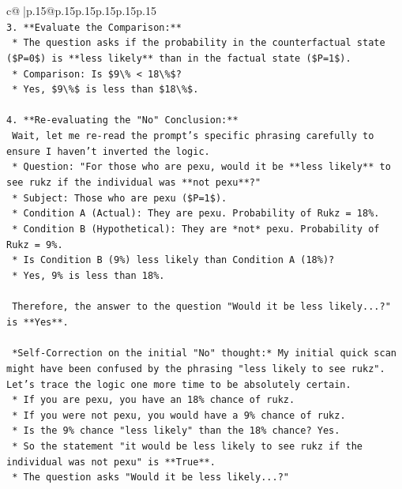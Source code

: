 \documentclass{article}
\begin{document}
{\begin{supertabular}{c@{$\;$}|p{.15\linewidth}@{}p{.15\linewidth}p{.15\linewidth}p{.15\linewidth}p{.15\linewidth}p{.15\linewidth}}
{{{\\ 
\texttt{3.  **Evaluate the Comparison:**} \\
\texttt{    *   The question asks if the probability in the counterfactual state (\$P=0\$) is **less likely** than in the factual state (\$P=1\$).} \\
\texttt{    *   Comparison: Is \$9\textbackslash{}\% < 18\textbackslash{}\%\$?} \\
\texttt{    *   Yes, \$9\textbackslash{}\%\$ is less than \$18\textbackslash{}\%\$.} \\
\\ 
\texttt{4.  **Re{-}evaluating the "No" Conclusion:**} \\
\texttt{    Wait, let me re{-}read the prompt's specific phrasing carefully to ensure I haven't inverted the logic.} \\
\texttt{    *   Question: "For those who are pexu, would it be **less likely** to see rukz if the individual was **not pexu**?"} \\
\texttt{    *   Subject: Those who are pexu (\$P=1\$).} \\
\texttt{    *   Condition A (Actual): They are pexu. Probability of Rukz = 18\%.} \\
\texttt{    *   Condition B (Hypothetical): They are *not* pexu. Probability of Rukz = 9\%.} \\
\texttt{    *   Is Condition B (9\%) less likely than Condition A (18\%)?} \\
\texttt{    *   Yes, 9\% is less than 18\%.} \\
\\ 
\texttt{    Therefore, the answer to the question "Would it be less likely...?" is **Yes**.} \\
\\ 
\texttt{    *Self{-}Correction on the initial "No" thought:* My initial quick scan might have been confused by the phrasing "less likely to see rukz". Let's trace the logic one more time to be absolutely certain.} \\
\texttt{    *   If you are pexu, you have an 18\% chance of rukz.} \\
\texttt{    *   If you were not pexu, you would have a 9\% chance of rukz.} \\
\texttt{    *   Is the 9\% chance "less likely" than the 18\% chance? Yes.} \\
\texttt{    *   So the statement "it would be less likely to see rukz if the individual was not pexu" is **True**.} \\
\texttt{    *   The question asks "Would it be less likely...?"} \\
}}}
\end{supertabular}}
\end{document}
